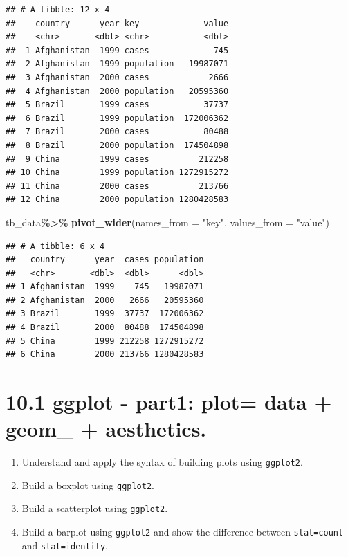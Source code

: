 \documentclass[
]{article}
\newenvironment{Shaded}{\begin{snugshade}}{\end{snugshade}}
\newcommand{\AttributeTok}[1]{\textcolor[rgb]{0.13,0.29,0.53}{#1}}
\newcommand{\FunctionTok}[1]{\textcolor[rgb]{0.13,0.29,0.53}{\textbf{#1}}}
\newcommand{\NormalTok}[1]{#1}
\newcommand{\SpecialCharTok}[1]{\textcolor[rgb]{0.81,0.36,0.00}{\textbf{#1}}}
\newcommand{\StringTok}[1]{\textcolor[rgb]{0.31,0.60,0.02}{#1}}
\providecommand{\tightlist}{%
  \setlength{\itemsep}{0pt}\setlength{\parskip}{0pt}}
\begin{document}
\begin{verbatim}
## # A tibble: 12 x 4
##    country      year key             value
##    <chr>       <dbl> <chr>           <dbl>
##  1 Afghanistan  1999 cases             745
##  2 Afghanistan  1999 population   19987071
##  3 Afghanistan  2000 cases            2666
##  4 Afghanistan  2000 population   20595360
##  5 Brazil       1999 cases           37737
##  6 Brazil       1999 population  172006362
##  7 Brazil       2000 cases           80488
##  8 Brazil       2000 population  174504898
##  9 China        1999 cases          212258
## 10 China        1999 population 1272915272
## 11 China        2000 cases          213766
## 12 China        2000 population 1280428583
\end{verbatim}

\begin{Shaded}
\begin{Highlighting}[]
\NormalTok{tb\_data}\SpecialCharTok{\%\textgreater{}\%}
  \FunctionTok{pivot\_wider}\NormalTok{(}\AttributeTok{names\_from =} \StringTok{"key"}\NormalTok{, }\AttributeTok{values\_from =} \StringTok{"value"}\NormalTok{)}
\end{Highlighting}
\end{Shaded}

\begin{verbatim}
## # A tibble: 6 x 4
##   country      year  cases population
##   <chr>       <dbl>  <dbl>      <dbl>
## 1 Afghanistan  1999    745   19987071
## 2 Afghanistan  2000   2666   20595360
## 3 Brazil       1999  37737  172006362
## 4 Brazil       2000  80488  174504898
## 5 China        1999 212258 1272915272
## 6 China        2000 213766 1280428583
\end{verbatim}

\hypertarget{ggplot---part1-plot-data-geom_-aesthetics.}{%
\section{10.1 ggplot - part1: plot= data + geom\_ +
aesthetics.}\label{ggplot---part1-plot-data-geom_-aesthetics.}}

\begin{enumerate}
\def\labelenumi{\arabic{enumi}.}
\tightlist
\item
  Understand and apply the syntax of building plots using
  \texttt{ggplot2}.\\
\item
  Build a boxplot using \texttt{ggplot2}.\\
\item
  Build a scatterplot using \texttt{ggplot2}.\\
\item
  Build a barplot using \texttt{ggplot2} and show the difference between
  \texttt{stat=count} and \texttt{stat=identity}.
\end{enumerate}
\end{document}
